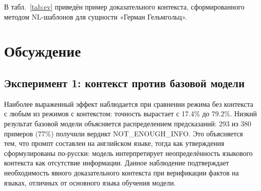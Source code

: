 \documentclass{misisarticle}
\begin{document}
В табл.~\ref{tab:ev} приведён пример доказательного
контекста, сформированного методом NL-шаблонов
для сущности «Герман Гельмгольц».

\begin{table}[h]
\centering
\caption{Пример доказательного контекста
для сущности «Герман Гельмгольц»}\label{tab:ev}
\end{table}

\section{Обсуждение}

\subsection{Эксперимент 1: контекст против базовой модели}

Наиболее выраженный эффект наблюдается при сравнении
режима без контекста с любым из режимов с контекстом:
точность вырастает с 17.4\% до 79.2\%.
Низкий результат базовой модели объясняется
распределением предсказаний: 293 из 380 примеров
(77\%) получили вердикт NOT\_ENOUGH\_INFO.
Это объясняется тем, что промпт составлен на английском
языке, тогда как утверждения сформулированы по-русски:
модель интерпретирует неопределённость языкового
контекста как отсутствие информации.
Данное наблюдение подтверждает необходимость
явного доказательного контекста при верификации фактов
на языках, отличных от основного языка обучения модели.
\end{document}

